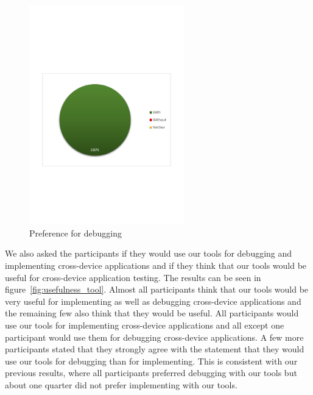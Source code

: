\begin{figure}[H]
  \centering
    \includegraphics[width=0.6\textwidth]{images/charts/prefer_debugging.pdf}
	\caption[Preference for debugging]{Preference for debugging}
	\label{fig:prefer_debugging}
\end{figure}


We also asked the participants if they would use our tools for debugging and implementing cross-device applications and if they think that our tools would be useful for cross-device application testing. The results can be seen in figure~\ref{fig:usefulness_tool}. Almost all participants think that our tools would be very useful for implementing as well as debugging cross-device applications and the remaining few also think that they would be useful. All participants would use our tools for implementing cross-device applications and all except one participant would use them for debugging cross-device applications. A few more participants stated that they strongly agree with the statement that they would use our tools for debugging than for implementing. This is consistent with our previous results, where all participants preferred debugging with our tools but about one quarter did not prefer implementing with our tools.

